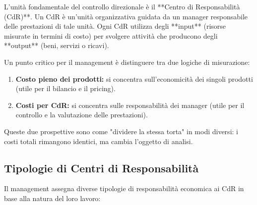 \documentclass[a4paper,10pt]{article}
\begin{document}
L'unità fondamentale del controllo direzionale è il **Centro di Responsabilità (CdR)**. Un CdR è un'unità organizzativa guidata da un manager responsabile delle prestazioni di tale unità. Ogni CdR utilizza degli **input** (risorse misurate in termini di costo) per svolgere attività che producono degli **output** (beni, servizi o ricavi).

Un punto critico per il management è distinguere tra due logiche di misurazione:
\begin{enumerate}
    \item \textbf{Costo pieno dei prodotti:} si concentra sull'economicità dei singoli prodotti (utile per il bilancio e il pricing).
    \item \textbf{Costi per CdR:} si concentra sulle responsabilità dei manager (utile per il controllo e la valutazione delle prestazioni).
\end{enumerate}
Queste due prospettive sono come "dividere la stessa torta" in modi diversi: i costi totali rimangono identici, ma cambia l'oggetto di analisi.

\subsection*{Tipologie di Centri di Responsabilità}

Il management assegna diverse tipologie di responsabilità economica ai CdR in base alla natura del loro lavoro:

\begin{table}[H]
\setlength{\extrarowheight}{10pt}
\caption{Classificazione dei Centri di Responsabilità}
\end{table}
\end{document}
